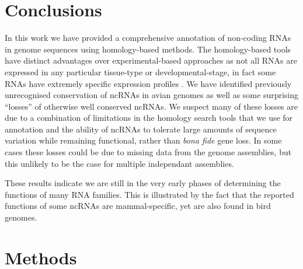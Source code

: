 \documentclass[10pt]{bmc_article}
\newenvironment{bmcformat}{\begin{raggedright}\baselineskip20pt\sloppy\setboolean{publ}{false}}{\end{raggedright}\baselineskip20pt\sloppy}
\begin{document}
\begin{bmcformat}

\section*{Conclusions}


In this work we have provided a comprehensive annotation of non-coding
RNAs in genome sequences using homology-based methods. The
homology-based tools have distinct advantages over experimental-based
approaches as not all RNAs are expressed in any particular tissue-type
or developmental-stage, in fact some RNAs have extremely specific
expression profiles \cite{Johnston:2003}.  We have identified
previously unrecognised conservation of ncRNAs in avian genomes as
well as some surprising ``losses'' of otherwise well conserved
ncRNAs. We suspect many of these losses are due to a combination of
limitations in the homology search tools that we use for annotation
and the ability of ncRNAs to tolerate large amounts of sequence
variation while remaining functional, rather than \emph{bona fide}
gene loss. In some cases these losses could be due to missing data
from the genome assemblies, but this unlikely to be the case for
multiple independant assemblies.

These results indicate we are still in the very early phases of
determining the functions of many RNA families. This is illustrated by
the fact that the reported functions of some ncRNAs are
mammal-specific, yet are also found in bird genomes.

\section*{Methods}


\end{bmcformat}
\end{document}
